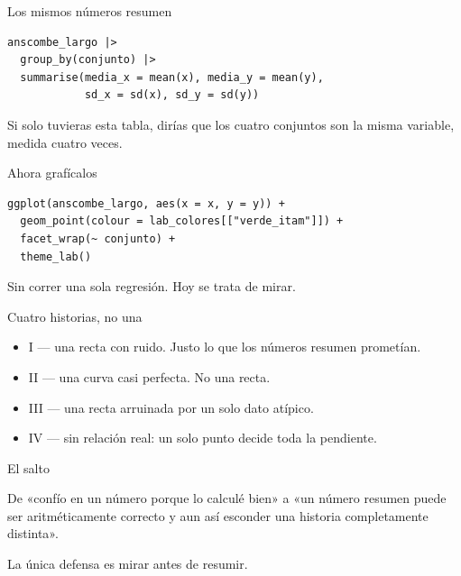 \begin{frame}[fragile]{Los mismos números resumen}
\begin{lstlisting}
anscombe_largo |>
  group_by(conjunto) |>
  summarise(media_x = mean(x), media_y = mean(y),
            sd_x = sd(x), sd_y = sd(y))
\end{lstlisting}

  \vspace{0.6em}
  Si solo tuvieras esta tabla, dirías que los cuatro conjuntos son la
  misma variable, medida cuatro veces.
\end{frame}

\begin{frame}[fragile]{Ahora grafícalos}
\begin{lstlisting}
ggplot(anscombe_largo, aes(x = x, y = y)) +
  geom_point(colour = lab_colores[["verde_itam"]]) +
  facet_wrap(~ conjunto) +
  theme_lab()
\end{lstlisting}

  \vspace{0.5em}
  {\small Sin correr una sola regresión. Hoy se trata de mirar.}
\end{frame}

\begin{frame}{Cuatro historias, no una}
  \vspace{0.3em}
  \begin{itemize}\setlength{\itemsep}{0.8em}
    \item<1-> \ac{I} — una recta con ruido. Justo lo que los números
          resumen prometían.
    \item<2-> \ac{II} — una curva casi perfecta. No una recta.
    \item<3-> \ac{III} — una recta arruinada por un solo dato atípico.
    \item<4-> \ac{IV} — sin relación real: un solo punto decide toda la
          pendiente.
  \end{itemize}
\end{frame}

\begin{frame}{El salto}
  \vspace{0.5em}
  \begin{saltobox}
    De «confío en un número porque lo calculé bien» a «un número resumen
    puede ser aritméticamente correcto y aun así esconder una historia
    completamente distinta».

    \vspace{0.6em}
    La única defensa es mirar antes de resumir.
  \end{saltobox}
\end{frame}

